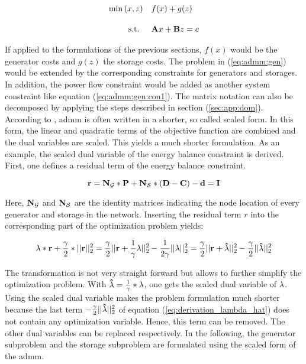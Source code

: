 \begin{subequations}
	\begin{align}
		\min{(x, z)} \quad & f(x) + g(z) \label{eq:admm:gen}\\[10pt]
		\text{s.t. } \quad & \vb{A}x + \vb{B}z = c \label{eq:admm:gen:con1}
	\end{align}
\end{subequations}

If applied to the formulations of the previous sections, $f(x)$ would be the generator costs and $g(z)$ the storage costs. The problem in (\ref{eq:admm:gen}) would be extended by the corresponding constraints for generators and storages. In addition, the power flow constraint would be added as another system constraint like equation (\ref{eq:admm:gen:con1}). The matrix notation can also be decomposed by applying the steps described in section (\ref{sec:app:dom}). \\

According to \citet{boyd2010}, \gls{admm} is often written in a shorter, so called scaled form. In this form, the linear and quadratic terms of the objective function are combined and the dual variables are scaled. This yields a much shorter formulation. As an example, the scaled dual variable of the energy balance constraint is derived. First, one defines a residual term of the energy balance constraint.

\begin{equation}
	\vb{r} = \vb{N_\mathcal{G}}*\vb{P} + \vb{N_\mathcal{S}}*(\vb{D} - \vb{C}) - \vb{d} = \vb{I}
\end{equation}

Here, $\vb{N_\mathcal{G}}$ and $\vb{N_\mathcal{S}}$ are the identity matrices indicating the node location of every generator and storage in the network. Inserting the residual term $r$ into the corresponding part of the optimization problem yields:

\begin{equation}
	\vb{\lambda} * \vb{r} + \frac{\gamma}{2} * || \vb{r} ||^2_2 = \frac{\gamma}{2} || \vb{r} + \frac{1}{\gamma}\vb{\lambda} ||^2_2 - \frac{1}{2\gamma}|| \vb{\lambda} ||^2_2 = \frac{\gamma}{2} || \vb{r} + \vb{\hat{\lambda}} ||^2_2 - \frac{\gamma}{2}|| \vb{\hat{\lambda}} ||^2_2 \label{eq:derivation_lambda_hat}
\end{equation}

The transformation is not very straight forward but allows to further simplify the  optimization problem. With $\vb{\hat{\lambda}} = \frac{1}{\gamma}*\vb{\lambda}$, one gets the scaled dual variable of $\vb{\lambda}$. Using the scaled dual variable makes the problem formulation much shorter because the last term $- \frac{\gamma}{2}|| \vb{\hat{\lambda}} ||^2_2$ of equation (\ref{eq:derivation_lambda_hat}) does not contain any optimization variable. Hence, this term can be removed. The other dual variables can be replaced respectively. In the following, the generator subproblem and the storage subproblem are formulated using the scaled form of the \gls{admm}.

